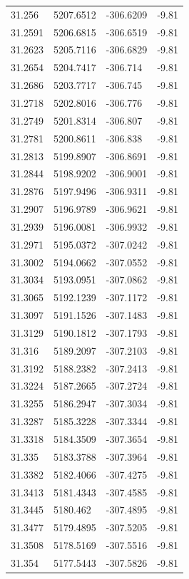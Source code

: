 \begin{table}[H]
\begin{tabular}{llll}
31.256 & 5207.6512 & -306.6209 & -9.81 \\
31.2591 & 5206.6815 & -306.6519 & -9.81 \\
31.2623 & 5205.7116 & -306.6829 & -9.81 \\
31.2654 & 5204.7417 & -306.714 & -9.81 \\
31.2686 & 5203.7717 & -306.745 & -9.81 \\
31.2718 & 5202.8016 & -306.776 & -9.81 \\
31.2749 & 5201.8314 & -306.807 & -9.81 \\
31.2781 & 5200.8611 & -306.838 & -9.81 \\
31.2813 & 5199.8907 & -306.8691 & -9.81 \\
31.2844 & 5198.9202 & -306.9001 & -9.81 \\
31.2876 & 5197.9496 & -306.9311 & -9.81 \\
31.2907 & 5196.9789 & -306.9621 & -9.81 \\
31.2939 & 5196.0081 & -306.9932 & -9.81 \\
31.2971 & 5195.0372 & -307.0242 & -9.81 \\
31.3002 & 5194.0662 & -307.0552 & -9.81 \\
31.3034 & 5193.0951 & -307.0862 & -9.81 \\
31.3065 & 5192.1239 & -307.1172 & -9.81 \\
31.3097 & 5191.1526 & -307.1483 & -9.81 \\
31.3129 & 5190.1812 & -307.1793 & -9.81 \\
31.316 & 5189.2097 & -307.2103 & -9.81 \\
31.3192 & 5188.2382 & -307.2413 & -9.81 \\
31.3224 & 5187.2665 & -307.2724 & -9.81 \\
31.3255 & 5186.2947 & -307.3034 & -9.81 \\
31.3287 & 5185.3228 & -307.3344 & -9.81 \\
31.3318 & 5184.3509 & -307.3654 & -9.81 \\
31.335 & 5183.3788 & -307.3964 & -9.81 \\
31.3382 & 5182.4066 & -307.4275 & -9.81 \\
31.3413 & 5181.4343 & -307.4585 & -9.81 \\
31.3445 & 5180.462 & -307.4895 & -9.81 \\
31.3477 & 5179.4895 & -307.5205 & -9.81 \\
31.3508 & 5178.5169 & -307.5516 & -9.81 \\
31.354 & 5177.5443 & -307.5826 & -9.81 \\

\end{tabular}
\end{table}
